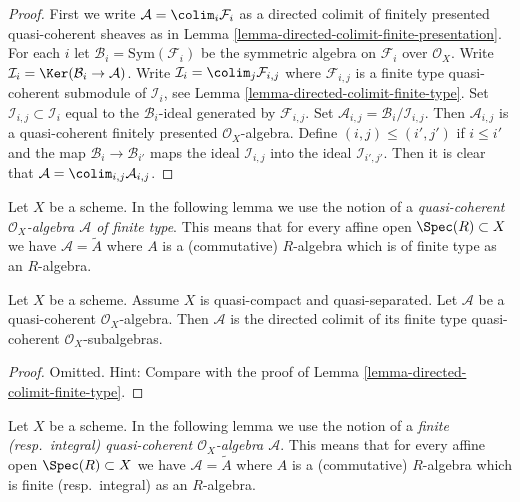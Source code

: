 \begin{proof}
First we write $\mathcal{A} = \colim_i \mathcal{F}_i$ as a directed
colimit of finitely presented quasi-coherent sheaves as in
Lemma \ref{lemma-directed-colimit-finite-presentation}.
For each $i$ let $\mathcal{B}_i = \text{Sym}(\mathcal{F}_i)$ be the
symmetric algebra on $\mathcal{F}_i$ over $\mathcal{O}_X$. Write
$\mathcal{I}_i = \Ker(\mathcal{B}_i \to \mathcal{A})$. Write
$\mathcal{I}_i = \colim_j \mathcal{F}_{i, j}$ where
$\mathcal{F}_{i, j}$ is a finite type quasi-coherent submodule of
$\mathcal{I}_i$, see
Lemma \ref{lemma-directed-colimit-finite-type}.
Set $\mathcal{I}_{i, j} \subset \mathcal{I}_i$
equal to the $\mathcal{B}_i$-ideal generated by $\mathcal{F}_{i, j}$.
Set $\mathcal{A}_{i, j} = \mathcal{B}_i/\mathcal{I}_{i, j}$.
Then $\mathcal{A}_{i, j}$ is a quasi-coherent finitely presented
$\mathcal{O}_X$-algebra. Define $(i, j) \leq (i', j')$ if
$i \leq i'$ and the map $\mathcal{B}_i \to \mathcal{B}_{i'}$
maps the ideal $\mathcal{I}_{i, j}$ into the ideal $\mathcal{I}_{i', j'}$.
Then it is clear that $\mathcal{A} = \colim_{i, j} \mathcal{A}_{i, j}$.
\end{proof}

\noindent
Let $X$ be a scheme. In the following lemma we use the notion
of a {\it quasi-coherent $\mathcal{O}_X$-algebra $\mathcal{A}$
of finite type}. This means that for every affine open
$\Spec(R) \subset X$ we have $\mathcal{A} = \widetilde{A}$
where $A$ is a (commutative) $R$-algebra which is of finite type
as an $R$-algebra.

\begin{lemma}
\label{lemma-algebra-directed-colimit-finite-type}
Let $X$ be a scheme. Assume $X$ is quasi-compact and quasi-separated.
Let $\mathcal{A}$ be a quasi-coherent $\mathcal{O}_X$-algebra.
Then $\mathcal{A}$ is the directed colimit of its finite type
quasi-coherent $\mathcal{O}_X$-subalgebras.
\end{lemma}

\begin{proof}
Omitted. Hint: Compare with the proof of
Lemma \ref{lemma-directed-colimit-finite-type}.
\end{proof}

\noindent
Let $X$ be a scheme. In the following lemma we use the notion
of a {\it finite (resp.\ integral) quasi-coherent
$\mathcal{O}_X$-algebra $\mathcal{A}$}. This means that for every
affine open $\Spec(R) \subset X$ we have
$\mathcal{A} = \widetilde{A}$ where $A$ is a (commutative) $R$-algebra
which is finite (resp.\ integral) as an $R$-algebra.

